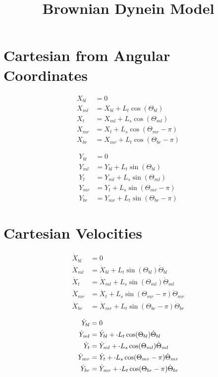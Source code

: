 \documentclass[11pt, landscape]{article}
\title{Brownian Dynein Model}
\newcommand{\mn}{\scalebox{0.7}[1.0]{-}}
\begin{document}
\maketitle

\section{Cartesian from Angular Coordinates}
\begin{align}
  X_{bl} &= 0 \\
  X_{ml} &= X_{bl}+L_{t}\cos(\Theta_{bl}) \\
  X_{t}  &= X_{ml}+L_{s}\cos(\Theta_{ml}) \\
  X_{mr} &= X_{t} +L_{s}\cos(\Theta_{mr}-\pi) \\
  X_{br} &= X_{mr}+L_{t}\cos(\Theta_{br}-\pi)
\end{align}

\begin{align}
  Y_{bl} &= 0 \\
  Y_{ml} &= Y_{bl}+L_{t}\sin(\Theta_{bl}) \\
  Y_{t}  &= Y_{ml}+L_{s}\sin(\Theta_{ml}) \\
  Y_{mr} &= Y_{t} +L_{s}\sin(\Theta_{mr}-\pi) \\
  Y_{br} &= Y_{mr}+L_{t}\sin(\Theta_{br}-\pi)
\end{align}

\section{Cartesian Velocities}
\begin{align}
  \dot{X}_{bl} &= 0 \\
  \dot{X}_{ml} &= \dot{X}_{bl} + L_{t}\sin(\Theta_{bl})      \dot{\Theta}_{bl} \\
  \dot{X}_{t } &= \dot{X}_{ml} + L_{s}\sin(\Theta_{ml})      \dot{\Theta}_{ml} \\
  \dot{X}_{mr} &= \dot{X}_{t } + L_{s}\sin(\Theta_{mr}-\pi)  \dot{\Theta}_{mr} \\
  \dot{X}_{br} &= \dot{X}_{mr} + L_{t}\sin(\Theta_{br}-\pi)  \dot{\Theta}_{br}
\end{align}  
             
\begin{align}                                                                          
  \dot{Y}_{bl} &= 0 \\                                                        
  \dot{Y}_{ml} &= \dot{Y}_{bl} + \mn L_{t}\cos(\Theta_{bl})      \dot{\Theta}_{bl} \\
  \dot{Y}_{t}  &= \dot{Y}_{ml} + \mn L_{s}\cos(\Theta_{ml})      \dot{\Theta}_{ml} \\
  \dot{Y}_{mr} &= \dot{Y}_{t } + \mn L_{s}\cos(\Theta_{mr}-\pi)  \dot{\Theta}_{mr} \\
  \dot{Y}_{br} &= \dot{Y}_{mr} + \mn L_{t}\cos(\Theta_{br}-\pi)  \dot{\Theta}_{br}
\end{align}
\end{document}
